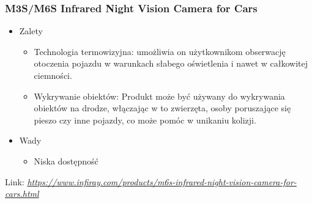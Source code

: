         \subsubsection*{M3S/M6S Infrared Night Vision Camera for Cars} %
        \begin{itemize}
            \item Zalety
            \begin{itemize}
                \item Technologia termowizyjna: umożliwia on użytkownikom obserwację otoczenia pojazdu 
                w warunkach słabego oświetlenia i nawet w całkowitej ciemności.
                \item Wykrywanie obiektów: Produkt może być używany do wykrywania obiektów na drodze, 
                włączając w to zwierzęta, osoby poruszające się pieszo czy inne pojazdy, 
                co może pomóc w unikaniu kolizji.
            \end{itemize}
            \item Wady
            \begin{itemize}
                \item Niska dostępność
            \end{itemize}
        \end{itemize}

        Link: \textit{\url{https://www.infiray.com/products/m6s-infrared-night-vision-camera-for-cars.html}}
